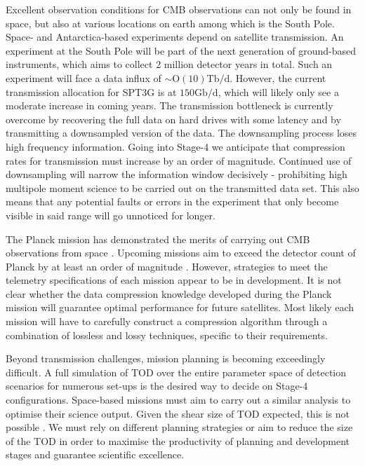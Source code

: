\documentclass[apj]{emulateapj}
\begin{document}
Excellent observation conditions for CMB observations can not only be found in space, but also at various locations on earth \citep{li2017, kovac2007} among which is the South Pole. Space- and Antarctica-based experiments depend on satellite transmission. An experiment at the South Pole will be part of the next generation of ground-based instruments, which aims to collect 2 million detector years in total. Such an experiment will face a data influx of $\sim \mathrm{O}(10)\mathrm{Tb/d}$. However, the current transmission allocation for SPT3G is at $150\mathrm{Gb/d}$, which will likely only see a moderate increase in coming years. The transmission bottleneck is currently overcome by recovering the full data on hard drives with some latency and by transmitting a downsampled version of the data. The downsampling process loses high frequency information. Going into Stage-4 we anticipate that compression rates for transmission must increase by an order of magnitude. Continued use of downsampling will narrow the information window decisively - prohibiting high multipole moment science to be carried out on the transmitted data set. This also means that any potential faults or errors in the experiment that only become visible in said range will go unnoticed for longer. %

The Planck mission has demonstrated the merits of carrying out CMB observations from space \citep{planck2018}. Upcoming missions aim to exceed the detector count of Planck by at least an order of magnitude \citep{litebird2014, pixie2011, core2018}. However, strategies to meet the telemetry specifications of each mission appear to be in development. It is not clear whether the data compression knowledge developed during the Planck mission will guarantee optimal performance for future satellites. Most likely each mission will have to carefully construct a compression algorithm through a combination of lossless and lossy techniques, specific to their requirements.


Beyond transmission challenges, mission planning is becoming exceedingly difficult. A full simulation of TOD over the entire parameter space of detection scenarios for numerous set-ups is the desired way to decide on Stage-4 configurations. Space-based missions must aim to carry out a similar analysis to optimise their science output. Given the shear size of TOD expected, this is not possible \citep{s4sciencebook}. We must rely on different planning strategies or aim to reduce the size of the TOD in order to maximise the productivity of planning and development stages and guarantee scientific excellence.
\end{document}
